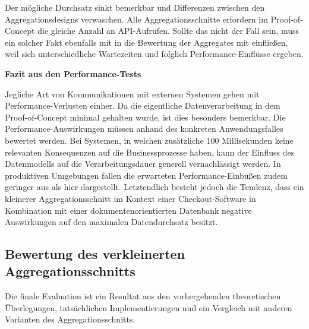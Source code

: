 Der mögliche Durchsatz sinkt bemerkbar und Differenzen zwischen den Aggregationsdesigns verwaschen. Alle Aggregationsschnitte erfordern im Proof-of-Concept die gleiche Anzahl an API-Aufrufen. Sollte das nicht der Fall sein, muss ein solcher Fakt ebenfalls mit in die Bewertung der Aggregates mit einfließen, weil sich unterschiedliche Wartezeiten und folglich Performance-Einflüsse ergeben. 


\textbf{Fazit aus den Performance-Tests}

Jegliche Art von Kommunikationen mit externen Systemen gehen mit Performance-Verlusten einher. Da die eigentliche Datenverarbeitung in dem Proof-of-Concept minimal gehalten wurde, ist dies besonders bemerkbar. Die Performance-Auswirkungen müssen anhand des konkreten Anwendungsfalles bewertet werden. Bei Systemen, in welchen zusätzliche 100 Millisekunden keine relevanten Konsequenzen auf die Businessprozesse haben, kann der Einfluss des Datenmodells auf die Verarbeitungsdauer generell vernachlässigt werden. In produktiven Umgebungen fallen die erwarteten Performance-Einbußen zudem geringer aus als hier dargestellt. Letztendlich besteht jedoch die Tendenz, dass ein kleinerer Aggregationsschnitt im Kontext einer Checkout-Software in Kombination mit einer dokumentenorientierten Datenbank negative Auswirkungen auf den maximalen Datendurchsatz besitzt.

\subsection{Bewertung des verkleinerten Aggregationsschnitts}

Die finale Evaluation ist ein Resultat aus den vorhergehenden theoretischen Überlegungen, tatsächlichen Implementierungen und ein Vergleich mit anderen Varianten des Aggregationsschnitts.

